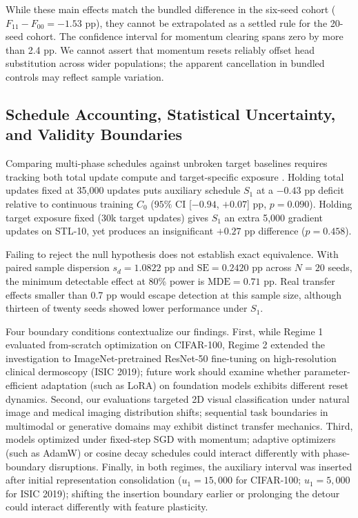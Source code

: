 \documentclass[sn-mathphys,Numbered]{sn-jnl}
\begin{document}
While these main effects match the bundled difference in the six-seed cohort ($F_{11} - F_{00} = -1.53$ pp), they cannot be extrapolated as a settled rule for the 20-seed cohort. The confidence interval for momentum clearing spans zero by more than 2.4 pp. We cannot assert that momentum resets reliably offset head substitution across wider populations; the apparent cancellation in bundled controls may reflect sample variation.

\subsection{Schedule Accounting, Statistical Uncertainty, and Validity Boundaries}\label{subsec:discussion_validity}

Comparing multi-phase schedules against unbroken target baselines requires tracking both total update compute and target-specific exposure \cite{mitchell2025unlearning}. Holding total updates fixed at 35,000 updates puts auxiliary schedule $S_1$ at a $-0.43$ pp deficit relative to continuous training $C_0$ ($95\%$ CI [$-0.94$, $+0.07$] pp, $p = 0.090$). Holding target exposure fixed (30k target updates) gives $S_1$ an extra 5,000 gradient updates on STL-10, yet produces an insignificant $+0.27$ pp difference ($p = 0.458$).

Failing to reject the null hypothesis does not establish exact equivalence. With paired sample dispersion $s_d = 1.0822$ pp and $\mathrm{SE} = 0.2420$ pp across $N = 20$ seeds, the minimum detectable effect at 80\% power is $\mathrm{MDE} = 0.71$ pp. Real transfer effects smaller than 0.7 pp would escape detection at this sample size, although thirteen of twenty seeds showed lower performance under $S_1$.

Four boundary conditions contextualize our findings. First, while Regime 1 evaluated from-scratch optimization on CIFAR-100, Regime 2 extended the investigation to ImageNet-pretrained ResNet-50 fine-tuning on high-resolution clinical dermoscopy (ISIC 2019); future work should examine whether parameter-efficient adaptation (such as LoRA) on foundation models exhibits different reset dynamics. Second, our evaluations targeted 2D visual classification under natural image and medical imaging distribution shifts; sequential task boundaries in multimodal or generative domains may exhibit distinct transfer mechanics. Third, models optimized under fixed-step SGD with momentum; adaptive optimizers (such as AdamW) or cosine decay schedules could interact differently with phase-boundary disruptions. Finally, in both regimes, the auxiliary interval was inserted after initial representation consolidation ($u_1 = 15{,}000$ for CIFAR-100; $u_1 = 5{,}000$ for ISIC 2019); shifting the insertion boundary earlier or prolonging the detour could interact differently with feature plasticity.
\end{document}
